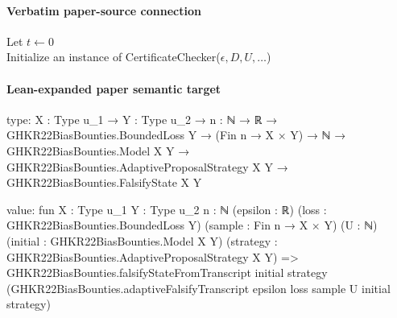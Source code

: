 \documentclass[10pt]{article}
\begin{document}
\paragraph{Verbatim paper-source connection}
\begin{ReviewVerbatim}
\begin{algorithm}
\ifdraft
\else
\small
\fi
{}
Let $t \leftarrow 0$ \\

Initialize an instance of CertificateChecker($\epsilon, D, U, \ldots$)

\caption{FalsifyAndUpdate($\epsilon,D,(f_1,g_1,h_1),\ldots )$: An algorithm that maintains a sequence of models $f_1,\ldots,f_T$ and accepts submissions of proposed certificates of sub-optimality $(g_i,h_i)$ that attempt to falsify the assertion that the current model $f_t$ is not $\epsilon$-Bayes optimal. It either accepts or rejects each submission: if it accepts a submission then it also updates its current model $f_t$ and outputs a new model $f_{t+1}$.}
\label{alg:FalsifyAndUpdate}
\end{algorithm}
\end{ReviewVerbatim}



\paragraph{Lean-expanded paper semantic target}
\begin{ReviewVerbatim}
type:
{X : Type u_1} →
  {Y : Type u_2} →
    {n : ℕ} →
      ℝ →
        GHKR22BiasBounties.BoundedLoss Y →
          (Fin n → X × Y) →
            ℕ →
              GHKR22BiasBounties.Model X Y →
                GHKR22BiasBounties.AdaptiveProposalStrategy X Y → GHKR22BiasBounties.FalsifyState X Y

value:
fun {X : Type u_1} {Y : Type u_2} {n : ℕ} (epsilon : ℝ) (loss : GHKR22BiasBounties.BoundedLoss Y)
    (sample : Fin n → X × Y) (U : ℕ) (initial : GHKR22BiasBounties.Model X Y)
    (strategy : GHKR22BiasBounties.AdaptiveProposalStrategy X Y) =>
  GHKR22BiasBounties.falsifyStateFromTranscript initial strategy
    (GHKR22BiasBounties.adaptiveFalsifyTranscript epsilon loss sample U initial strategy)
\end{ReviewVerbatim}
\end{document}
